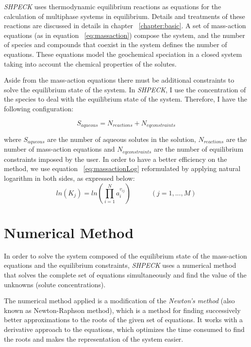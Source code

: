 \emph{SHPECK} uses thermodynamic equilibrium reactions as equations for the calculation of multiphase systems in equilibrium. Details and treatments of these reactions are discussed in details in chapter ~\ref{chapter:basic}. A set of mass-action equations (as in equation ~\ref{eq:massaction}) compose the system, and the number of species and compounds that coexist in the system defines the number of equations. These equations model the geochemical speciation in a closed system taking into account the chemical properties of the solutes.

Aside from the mass-action equations there must be additional constraints to solve the equilibrium state of the system. In \emph{SHPECK}, I use the concentration of the species to deal with the equilibrium state of the system. Therefore, I have the following configuration:

\begin{equation}\label{eq:configuration}
S_{aqueous} = N_{reactions} + N_{eq constraints}
\end{equation}

where $S_{aqueous}$ are the number of aqueous solutes in the solution, $N_{reactions}$ are the number of mass-action equations and $N_{eq constraints}$ are the number of equilibrium constraints imposed by the user. 
In order to have a better efficiency on the method, we use equation ~\ref{eq:massactionLog} reformulated by applying natural logarithm in both sides, as expressed below:
\begin{equation}\label{eq:massactionLog}
ln({K_j}) =  ln({\prod\limits_{i=1}^N  a_i^{v_{ij}}}) \hspace{35pt}    (j = 1, ... , M)
\end{equation}

\section{Numerical Method}
In order to solve the system composed of the equilibrium state of the mass-action equations and the equilibrium constraints, \emph{SHPECK} uses a numerical method that solves the complete set of equations simultaneously and find the value of the unknowns (solute concentrations).


The numerical method applied is a modification of the \emph{Newton's method} (also known as Newton-Raphson method), which is a method for finding successively better approximations to the roots of the given set of equations. It works with a derivative approach to the equations, which optimizes the time consumed to find the roots and makes the representation of the system easier.

